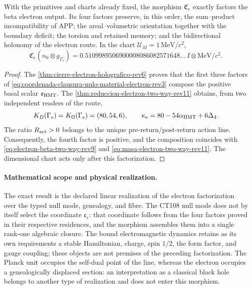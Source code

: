 \begin{theorem}
\label{thm:clausura-nulo-material-electron-rev3}
With the primitives and charts already fixed, the morphism \(\mathfrak C_e\) exactly factors the beta electron output. Its four factors preserve, in this order, the sum--product incompatibility of APP; the areal--volumetric orientation together with the boundary deficit; the torsion and retained memory; and the bidirectional holonomy of the electron route. In the chart \(\mathcal U_M=1\,\mathrm{MeV}/c^2\),
\begin{equation}
 \mathfrak C_e(n_0\otimes g_{\Gamma_e})
 =0.5109989506900008086082571648\ldots\,
  I\otimes\mathrm{MeV}/c^2.
 \label{eq:masa-clausura-nulo-material-electron-rev3}
\end{equation}
\end{theorem}

\begin{proof}
The \cref{thm:cierre-electron-holografico-rev6} proves that the first three
factors of
\eqref{eq:coordenada-clausura-nulo-material-electron-rev3} compose the
positive basal scalar \(\mathfrak e_{\rm HMT}\). The
\cref{thm:reduccion-electron-two-way-rev11} obtains, from two independent
readers of the route,
\[
 K_D(\Gamma_e)=K_\Omega(\Gamma_e)=(80,54,6),
 \qquad
 \kappa_e=80-54\alpha_{\rm HMT}+6\Delta_4.
\]
The ratio \(R_{\rm act}>0\) belongs to the unique pre-return/post-return
action line. Consequently, the fourth factor is positive, and
the composition coincides with
\eqref{eq:electron-beta-two-way-rev9} and
\eqref{eq:masa-electron-two-way-rev11}. The dimensional chart acts only
after this factorization.
\end{proof}

\paragraph{Mathematical scope and physical realization.}
The exact result is the declared linear realization of the electron factorization over the typed null mode, genealogy, and fibre. The CT108 null mode does not by itself select the coordinate \(\mathfrak c_e\): that coordinate follows from the four factors proved in their respective residences, and the morphism assembles them into a single rank-one algebraic closure. The bound electromagnetic dynamics retains as its own requirements a stable Hamiltonian, charge, spin \(1/2\), the form factor, and gauge coupling; these objects are not premises of the preceding factorization. The Planck unit occupies the self-dual point of the line, whereas the electron occupies a genealogically displaced section: an interpretation as a classical black hole belongs to another type of realization and does not enter this morphism.
